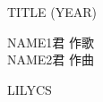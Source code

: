 ﻿\documentclass[10pt,a5j]{tarticle} %
\begin{document}
\thispagestyle{empty} %
\newcommand{\linespace}{1.0em} %
\newcommand{\blocksize}{0.5\hsize} %

\begin{minipage}[c]{0.7\hsize} %
	\begin{center}
		{\LARGE
			TITLE %
		}
		{\small 
			(YEAR) %
		}\\
	\end{center}
\end{minipage}
\begin{minipage}[c]{0.3\hsize} %
	\begin{flushright} %
		NAME1君 作歌\\ %
		NAME2君 作曲 %
	\end{flushright}
\end{minipage}

\vspace{1.5em} %
\begin{enumerate}
	\begin{minipage}[c]{\blocksize}
	
		LILYCS
	
	\end{minipage}
\end{enumerate}
\end{document}
